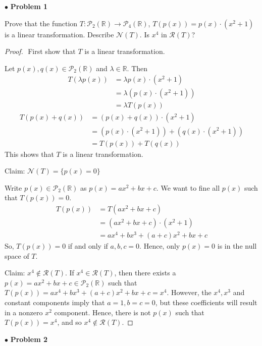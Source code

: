 \documentclass{article}
\begin{document}
$ \bullet$ \textbf{Problem 1}
\medskip

\begin{itshape}
Prove that the function $T: \mathcal{P}_2(\mathbb{R}) \to \mathcal{P}_4(\mathbb{R})$, $T(p(x)) = p(x) \cdot (x^2 +1)$ is a linear transformation. Describe $\mathcal{N}(T)$. Is $x^4$ in $\mathcal{R}(T)$?
\end{itshape}
\medskip

\begin{proof}
$ $\newline
First show that $T$ is a linear transformation.

Let $p(x), q(x) \in \mathcal{P}_2(\mathbb{R})$ and $\lambda \in \mathbb{R}$. Then
\begin{align*}
T(\lambda p(x)) &= \lambda p(x) \cdot (x^2+1) \\
&= \lambda (p(x) \cdot (x^2+1)) \\
&= \lambda T(p(x))
\end{align*}
\begin{align*}
T(p(x) + q(x)) &= (p(x) +q(x)) \cdot (x^2+1) \\
&= (p(x) \cdot (x^2+1)) + (q(x) \cdot (x^2+1)) \\
&= T(p(x)) + T(q(x))
\end{align*}
This shows that $T$ is a linear transformation.
\medskip

Claim: $\mathcal{N}(T) = \{ p(x) = 0 \}$

Write $p(x) \in \mathcal{P}_2(\mathbb{R})$ as $p(x) = ax^2+bx+c$. We want to fine all $p(x)$ such that $T(p(x)) = 0$.
\begin{align*}
T(p(x)) &= T(ax^2+bx+c) \\
&= (ax^2+bx+c) \cdot (x^2+1) \\
&= ax^4+bx^3+(a+c)x^2+bx+c
\end{align*}
So, $T(p(x)) = 0$ if and only if $a,b,c = 0$. Hence, only $p(x) = 0$ is in the null space of $T$.
\medskip

Claim: $x^4 \notin \mathcal{R}(T)$. If $x^4 \in \mathcal{R}(T)$, then there exists a $p(x) = ax^2+bx+c \in \mathcal{P}_2(\mathbb{R})$ such that $T(p(x)) =ax^4+bx^3+(a+c)x^2+bx+c= x^4$. However, the $x^4, x^3$ and constant components imply that $a=1, b=c=0$, but these coefficients will result in a nonzero $x^2$ component.  Hence, there is not $p(x)$ such that $T(p(x)) = x^4$, and so $x^4 \notin \mathcal{R}(T)$.
\end{proof}

\newpage
$ \bullet$ \textbf{Problem 2}
\medskip
\end{document}
